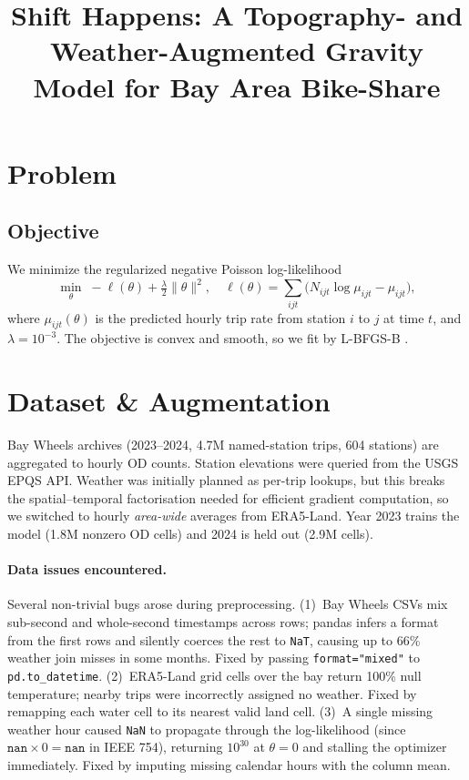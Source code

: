 \documentclass[twoside,11pt]{article}
\begin{document}
\title{Shift Happens: A Topography- and Weather-Augmented Gravity Model for Bay Area Bike-Share}
\newcommand{\shorttitle}{Shift Happens}
\maketitle

\section{Problem}

\subsection{Objective}

We minimize the regularized negative Poisson log-likelihood
\[
\min_{\theta}\; {-}\ell(\theta) + \tfrac{\lambda}{2}\|\theta\|^2, \quad
\ell(\theta) = \textstyle\sum_{ijt}\bigl(N_{ijt}\log\mu_{ijt} - \mu_{ijt}\bigr),
\]
where $\mu_{ijt}(\theta)$ is the predicted hourly trip rate from station $i$ to $j$ at time $t$, and $\lambda=10^{-3}$. The objective is convex and smooth, so we fit by L-BFGS-B \citep{Kochenderfer2022}.

\section{Dataset \& Augmentation}

Bay Wheels archives (2023--2024, 4.7M named-station trips, 604 stations) are aggregated to hourly OD counts. Station elevations were queried from the USGS EPQS API. Weather was initially planned as per-trip lookups, but this breaks the spatial--temporal factorisation needed for efficient gradient computation, so we switched to hourly \emph{area-wide} averages from ERA5-Land. Year 2023 trains the model (1.8M nonzero OD cells) and 2024 is held out (2.9M cells).

\paragraph{Data issues encountered.} Several non-trivial bugs arose during preprocessing. (1)~Bay Wheels CSVs mix sub-second and whole-second timestamps across rows; pandas infers a format from the first rows and silently coerces the rest to \texttt{NaT}, causing up to 66\% weather join misses in some months. Fixed by passing \texttt{format="mixed"} to \texttt{pd.to\_datetime}. (2)~ERA5-Land grid cells over the bay return 100\% null temperature; nearby trips were incorrectly assigned no weather. Fixed by remapping each water cell to its nearest valid land cell. (3)~A single missing weather hour caused \texttt{NaN} to propagate through the log-likelihood (since $\texttt{nan}\times 0 = \texttt{nan}$ in IEEE 754), returning $10^{30}$ at $\theta=0$ and stalling the optimizer immediately. Fixed by imputing missing calendar hours with the column mean.
\end{document}
